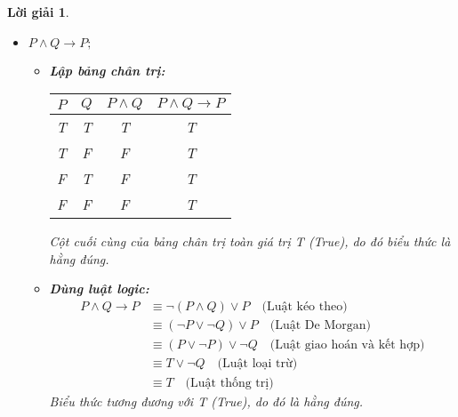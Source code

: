 \documentclass[11pt, oneside, a4paper]{article}
\newtheorem{loigiai}{Lời giải}[bt]
\begin{document}
\begin{loigiai}
\begin{itemize}
      \item[b)] $P \land Q \rightarrow P;$
        \begin{itemize}
            \item \textbf{Lập bảng chân trị:}
            \begin{center}
            \begin{tabular}{|c|c|c|c|}
            \hline
            $P$ & $Q$ & $P \land Q$ & $P \land Q \rightarrow P$ \\
            \hline
            T & T & T & T \\
            T & F & F & T \\
            F & T & F & T \\
            F & F & F & T \\
            \hline
            \end{tabular}
            \end{center}
            Cột cuối cùng của bảng chân trị toàn giá trị T (True), do đó biểu thức là hằng đúng.
            \item \textbf{Dùng luật logic:}
            \begin{align*} P \land Q \rightarrow P &\equiv \lnot (P \land Q) \lor P \quad \text{(Luật kéo theo)} \\ &\equiv (\lnot P \lor \lnot Q) \lor P \quad \text{(Luật De Morgan)} \\ &\equiv (P \lor \lnot P) \lor \lnot Q \quad \text{(Luật giao hoán và kết hợp)} \\ &\equiv T \lor \lnot Q \quad \text{(Luật loại trừ)} \\ &\equiv T \quad \text{(Luật thống trị)}\end{align*}
            Biểu thức tương đương với T (True), do đó là hằng đúng.
        \end{itemize}
    

\end{itemize}
\end{loigiai}
\end{document}
